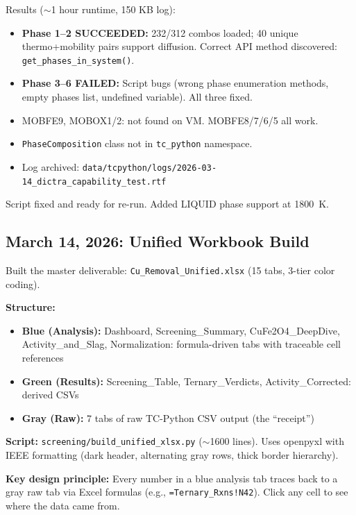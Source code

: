 \documentclass[11pt]{article}
\begin{document}
Results ($\sim$1 hour runtime, 150 KB log):
\begin{itemize}[leftmargin=*]
    \item \textbf{Phase 1--2 SUCCEEDED:} 232/312 combos loaded; 40 unique thermo+mobility pairs support diffusion. Correct API method discovered: \texttt{get\_phases\_in\_system()}.
    \item \textbf{Phase 3--6 FAILED:} Script bugs (wrong phase enumeration methods, empty phases list, undefined variable). All three fixed.
    \item MOBFE9, MOBOX1/2: not found on VM. MOBFE8/7/6/5 all work.
    \item \texttt{PhaseComposition} class not in \texttt{tc\_python} namespace.
    \item Log archived: \texttt{data/tcpython/logs/2026-03-14\_dictra\_capability\_test.rtf}
\end{itemize}

Script fixed and ready for re-run. Added LIQUID phase support at \SI{1800}{\kelvin}.

\subsection{March 14, 2026: Unified Workbook Build}

Built the master deliverable: \texttt{Cu\_Removal\_Unified.xlsx} (15 tabs, 3-tier color coding).

\textbf{Structure:}
\begin{itemize}[leftmargin=*]
    \item \textbf{Blue (Analysis):} Dashboard, Screening\_Summary, CuFe2O4\_DeepDive, Activity\_and\_Slag, Normalization: formula-driven tabs with traceable cell references
    \item \textbf{Green (Results):} Screening\_Table, Ternary\_Verdicts, Activity\_Corrected: derived CSVs
    \item \textbf{Gray (Raw):} 7 tabs of raw TC-Python CSV output (the ``receipt'')
\end{itemize}

\textbf{Script:} \texttt{screening/build\_unified\_xlsx.py} ($\sim$1600 lines). Uses openpyxl with IEEE formatting (dark header, alternating gray rows, thick border hierarchy).

\textbf{Key design principle:} Every number in a blue analysis tab traces back to a gray raw tab via Excel formulas (e.g., \texttt{=Ternary\_Rxns!N42}). Click any cell to see where the data came from.
\end{document}
